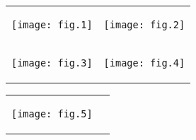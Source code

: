\documentclass[a4paper,landscape]{article}
\begin{document}
\thispagestyle{empty}
\begin{tabular}{ c c } %
\begin{minipage}[t]{.5\textwidth}
    \begin{center}
    \texttt{[image: fig.1]}
    \end{center}
    \bigskip
\end{minipage}&
\begin{minipage}[t]{.5\textwidth}
    \begin{center}\texttt{[image: fig.2]}\end{center}
    \bigskip
\end{minipage}\\ %
\begin{minipage}[t]{.5\textwidth}
    \bigskip
    \begin{center}\texttt{[image: fig.3]}\end{center}
\end{minipage}&
\begin{minipage}[t]{.5\textwidth}
    \bigskip
    \begin{center}\texttt{[image: fig.4]}\end{center}
\end{minipage}\\ %
\end{tabular}
\newpage

\thispagestyle{empty}
\begin{tabular}{ c c } %
\begin{minipage}[t]{.5\textwidth}
    \bigskip
    \begin{center}\texttt{[image: fig.5]}\end{center}
\end{minipage}&
\begin{minipage}[t]{.5\textwidth}
    \bigskip
\end{minipage}\\ %
\end{tabular}
\end{document}
